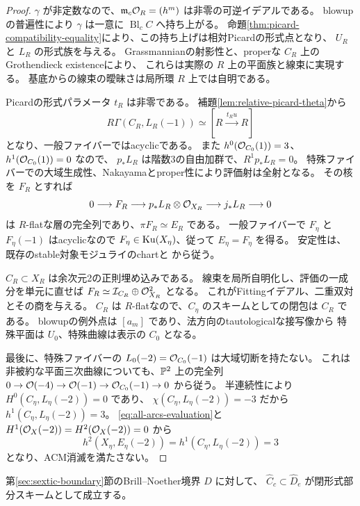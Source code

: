 \begin{proof}
$\gamma$ が非定数なので、$\mathfrak m_c\mathcal O_R=(h^m)$ は非零の可逆イデアルである。
blowupの普遍性により $\gamma$ は一意に $\operatorname{Bl}_cC$ へ持ち上がる。
命題\ref{thm:picard-compatibility-equality}により、この持ち上げは相対Picardの形式点となり、
$U_R$ と $L_R$ の形式族を与える。
Grassmannianの射影性と、properな $C_R$ 上のGrothendieck existenceにより、
これらは実際の $R$ 上の平面族と線束に実現する。
基底からの線束の曖昧さは局所環 $R$ 上では自明である。

Picardの形式パラメータ $t_R$ は非零である。
補題\ref{lem:relative-picard-theta}から
\[
 R\Gamma(C_R,L_R(-1))\simeq[R\xrightarrow{\,t_Ru\,}R]
\]
となり、一般ファイバーではacyclicである。
また $h^0(\mathcal O_{C_0}(1))=3$、$h^1(\mathcal O_{C_0}(1))=0$ なので、
$p_*L_R$ は階数3の自由加群で、$R^1p_*L_R=0$。
特殊ファイバーでの大域生成性、Nakayamaとproper性により評価射は全射となる。
その核を $F_R$ とすれば
\[
 0\longrightarrow F_R\longrightarrow p_*L_R\otimes\mathcal O_{X_R}
 \longrightarrow j_*L_R\longrightarrow0
\]
は $R$-flatな層の完全列であり、$\pi F_R\simeq E_R$ である。
一般ファイバーで $F_\eta$ と $F_\eta(-1)$ はacyclicなので
$F_\eta\in\operatorname{Ku}(X_\eta)$、従って $E_\eta=F_\eta$ を得る。
安定性は、既存のstable対象モジュライのchartと
\cite[Proposition 5.5]{FLZ}から従う。

$C_R\subset X_R$ は余次元2の正則埋め込みである。
線束を局所自明化し、評価の一成分を単元に直せば
$F_R\simeq\mathcal I_{C_R}\oplus\mathcal O_{X_R}^2$ となる。
これがFittingイデアル、二重双対とその商を与える。
$C_R$ は $R$-flatなので、$C_\eta$ のスキームとしての閉包は $C_R$ である。
blowupの例外点は $[a_m]$ であり、法方向のtautologicalな接写像から
特殊平面は $U_0$、特殊曲線は表示の $C_0$ となる。

最後に、特殊ファイバーの $L_0(-2)=\mathcal O_{C_0}(-1)$ は大域切断を持たない。
これは非被約な平面三次曲線についても、$\mathbb P^2$ 上の完全列
$0\to\mathcal O(-4)\to\mathcal O(-1)\to\mathcal O_{C_0}(-1)\to0$ から従う。
半連続性により $H^0(C_\eta,L_\eta(-2))=0$ であり、
$\chi(C_\eta,L_\eta(-2))=-3$ だから $h^1(C_\eta,L_\eta(-2))=3$。
\eqref{eq:all-arcs-evaluation}と $H^1(\mathcal O_X(-2))=H^2(\mathcal O_X(-2))=0$ から
\[
 h^2(X_\eta,E_\eta(-2))=h^1(C_\eta,L_\eta(-2))=3
\]
となり、ACM消滅を満たさない。
\end{proof}

\begin{theorem}[適合部分空間は非局所自由境界に含まれる]
\label{thm:compatibility-in-bn-boundary}
第\ref{sec:sextic-boundary}節のBrill--Noether境界 $D$ に対して、
$\widehat C_c\subset\widehat D_e$ が閉形式部分スキームとして成立する。
\end{theorem}

